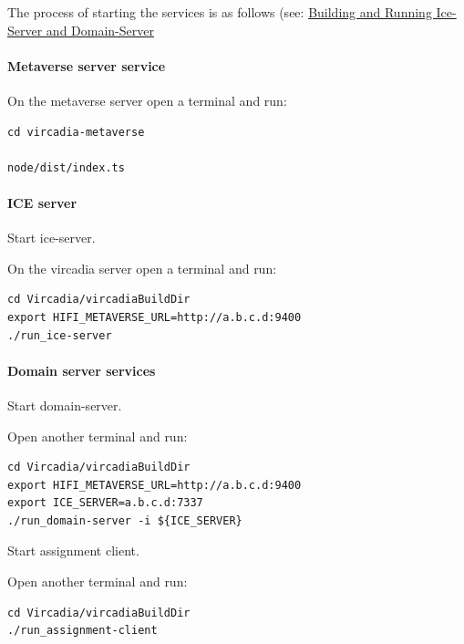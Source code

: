 The process of starting the services is as follows (see:
\href{https://github.com/vircadia/vircadia-metaverse/blob/master/docs/NotesOnDevelopment.md\#building-and-running-ice-server-and-domain-server}{Building
and Running Ice-Server and Domain-Server}

\hypertarget{metaverse-server-service}{%
\paragraph{Metaverse server service}\label{metaverse-server-service}}

On the metaverse server open a terminal and run:

\begin{verbatim}
cd vircadia-metaverse

node/dist/index.ts
\end{verbatim}

\hypertarget{ice-server}{%
\paragraph{ICE server}\label{ice-server}}

Start ice-server.

On the vircadia server open a terminal and run:

\begin{verbatim}
cd Vircadia/vircadiaBuildDir
export HIFI_METAVERSE_URL=http://a.b.c.d:9400
./run_ice-server
\end{verbatim}

\hypertarget{domain-server-services}{%
\paragraph{Domain server services}\label{domain-server-services}}

Start domain-server.

Open another terminal and run:

\begin{verbatim}
cd Vircadia/vircadiaBuildDir
export HIFI_METAVERSE_URL=http://a.b.c.d:9400
export ICE_SERVER=a.b.c.d:7337
./run_domain-server -i ${ICE_SERVER}
\end{verbatim}

Start assignment client.

Open another terminal and run:

\begin{verbatim}
cd Vircadia/vircadiaBuildDir
./run_assignment-client
\end{verbatim}

